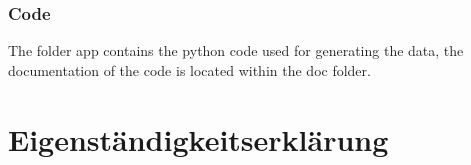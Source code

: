 \documentclass[12pt,a4paper, english,twoside]{article}
\begin{document}
\subsubsection{Code}
The folder app contains the python code used for generating the data, the documentation of the code is located within the doc folder.
%
%
\newpage
\printbibliography%
\newpage
\section*{Eigenständigkeitserklärung}

\end{document}
